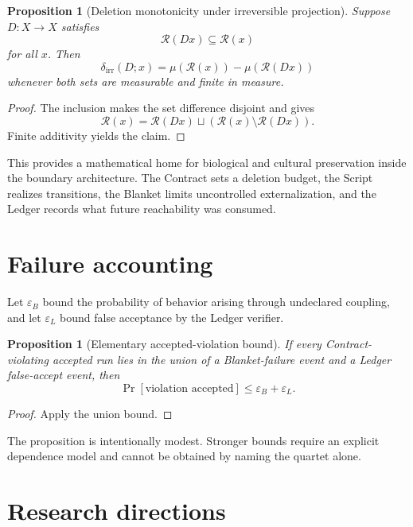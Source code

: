 \documentclass[11pt]{article}
\newtheorem{proposition}[definition]{Proposition}
\newcommand{\Reach}{\mathcal{R}}
\begin{document}
\begin{proposition}[Deletion monotonicity under irreversible projection]
Suppose $D:X\to X$ satisfies
\[
\Reach(Dx)\subseteq\Reach(x)
\]
for all $x$. Then
\[
\delta_{\mathrm{irr}}(D;x)
=
\mu(\Reach(x))-\mu(\Reach(Dx))
\]
whenever both sets are measurable and finite in measure.
\end{proposition}

\begin{proof}
The inclusion makes the set difference disjoint and gives
\[
\Reach(x)=\Reach(Dx)\sqcup(\Reach(x)\setminus\Reach(Dx)).
\]
Finite additivity yields the claim.
\end{proof}

This provides a mathematical home for biological and cultural preservation inside the boundary architecture. The Contract sets a deletion budget, the Script realizes transitions, the Blanket limits uncontrolled externalization, and the Ledger records what future reachability was consumed.

\section{Failure accounting}

Let $\varepsilon_B$ bound the probability of behavior arising through undeclared coupling, and let $\varepsilon_L$ bound false acceptance by the Ledger verifier.

\begin{proposition}[Elementary accepted-violation bound]
If every Contract-violating accepted run lies in the union of a Blanket-failure event and a Ledger false-accept event, then
\[
\Pr[\text{violation accepted}]
\le
\varepsilon_B+\varepsilon_L.
\]
\end{proposition}

\begin{proof}
Apply the union bound.
\end{proof}

The proposition is intentionally modest. Stronger bounds require an explicit dependence model and cannot be obtained by naming the quartet alone.

\section{Research directions}
\end{document}
